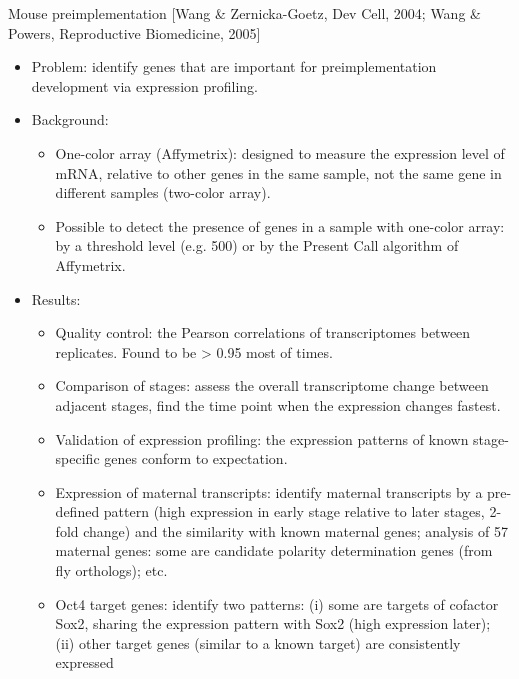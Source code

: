\documentclass{report}
\begin{document}
Mouse preimplementation [Wang \& Zernicka-Goetz, Dev Cell, 2004; Wang \& Powers, Reproductive Biomedicine, 2005]
\begin{itemize}
\item Problem: identify genes that are important for preimplementation development via expression profiling. 
	
\item Background: 
\begin{itemize}
	
	\item One-color array (Affymetrix): designed to measure the expression level of mRNA, relative to other genes in the same sample, not the same gene in different samples (two-color array). 
	
	\item Possible to detect the presence of genes in a sample with one-color array: by a threshold level (e.g. 500) or by the Present Call algorithm of Affymetrix. 
	
\end{itemize}
	
\item Results: 
	\begin{itemize}
		
		\item Quality control: the Pearson correlations of transcriptomes between replicates. Found to be > 0.95 most of times. 
		
		\item Comparison of stages: assess the overall transcriptome change between adjacent stages, find the time point when the expression changes fastest. 
		
		\item Validation of expression profiling: the expression patterns of known stage-specific genes conform to expectation. 
		
		\item Expression of maternal transcripts: identify maternal transcripts by a pre-defined pattern (high expression in early stage relative to later stages, 2-fold change) and the similarity with known maternal genes; analysis of 57 maternal genes: some are candidate polarity determination genes (from fly orthologs); etc. 
		
		\item Oct4 target genes: identify two patterns: (i) some are targets of cofactor Sox2, sharing the expression pattern with Sox2 (high expression later); (ii) other target genes (similar to a known target) are consistently expressed 
		

\end{itemize}
\end{itemize}
\end{document}
